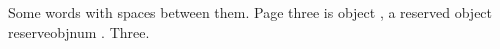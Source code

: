 \documentclass{article}
\begin{document}
\pdfinterwordspaceon
Some words with spaces between them.
\newpage
Page three is object , a reserved object
\pdfobj reserveobjnum \the\pdflastobj.
\newpage
Three.
\end{document}
